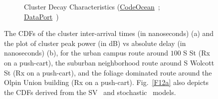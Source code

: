 \documentclass[10pt, twocolumn]{IEEEtran}
\begin{document}
{\begin{figure} [t]
\begin{subfigure}{0.4925\linewidth}
        \caption{Cluster Decay Characteristics (\href{https://codeocean.com/capsule/9545863/tree}{CodeOcean}~\cite{CodeOcean}; \href{http://ieee-dataport.org/12580}{DataPort}~\cite{DataPort})}
        \label{F12b}
    \end{subfigure}
    \vspace{-5mm}
    \caption{The CDFs of the cluster inter-arrival times (in nanoseconds) (a) and the plot of cluster peak power (in dB) vs absolute delay (in nanoseconds) (b), for the urban campus route around $100$ S St (Rx on a push-cart), the suburban neighborhood route around S Wolcott St (Rx on a push-cart), and the foliage dominated route around the Olpin Union building (Rx on a push-cart). Fig.~\ref{F12a} also depicts the CDFs derived from the SV~\cite{SV_Molisch} and stochastic~\cite{Indoor60G} models.}
    \vspace{-6mm}
    \label{F12}
\end{figure}
}
\end{document}
